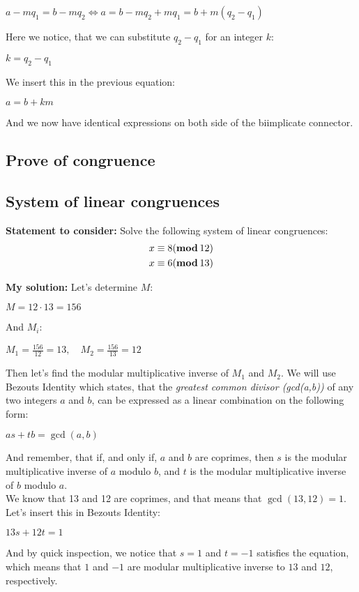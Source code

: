 \documentclass{report}
\newcommand{\cent}[1]{\begin{center}#1\end{center}}
\newcommand{\mAlign}[1]{\begin{align*}#1\end{align*}}
\newcommand{\assignmentDescription}{\textbf{Statement to consider: }}
\newcommand{\solution}{\textbf{My solution: }}
\newcommand{\QED}{\boxed{}}
\newcommand{\modInline}{\text{\textbf{mod\,}}}
\begin{document}
	\cent{$a - m q_1 = b - mq_2 \Leftrightarrow a = b -mq_2 + mq_1 = b + m(q_2-q_1)$}
	
	Here we notice, that we can substitute $q_2 - q_1$ for an integer $k$:
	
	\cent{$k = q_2 -q_1$}
	
	We insert this in the previous equation:
	
	\cent{$a = b+km$}
	
	And we now have identical expressions on both side of the biimplicate connector.\\
	\QED
 	\subsection{Prove of congruence}
 	
 	\subsection{System of linear congruences}
 	\assignmentDescription
 	Solve the following system of linear congruences:
 	\mAlign{x &\equiv 8 (\modInline 12) \\
 				  x &\equiv 6 (\modInline 13)}
 	
 	\solution
 	Let's determine $M$:
 	
 	\cent{$M = 12 \cdot 13 = 156$}
 	
 	And $M_i$:
 	
 	\cent{$M_1 = \frac{156}{12} = 13, \quad M_2 = \frac{156}{13} = 12$}
 	
 	Then let's find the modular multiplicative inverse of $M_1$ and $M_2$. We will use Bezouts Identity which states, that the \textit{greatest common divisor (gcd(a,b))} of any two integers $a$ and $b$, can be expressed as a linear combination on the following form:
 	
 	\cent{$as+tb=\gcd(a,b)$}
 	
 	And remember, that if, and only if, $a$ and $b$ are coprimes, then $s$ is the modular multiplicative inverse of $a$ modulo $b$, and $t$ is the modular multiplicative inverse of $b$ modulo $a$.\\
 	
 	We know that 13 and 12 are coprimes, and that means that $\gcd(13,12) = 1$. Let's insert this in Bezouts Identity:
 	
 	\cent{$13s+12t=1$}
 	
 	And by quick inspection, we notice that $s=1$ and $t=-1$ satisfies the equation, which means that $1$ and $-1$ are modular multiplicative inverse to $13$ and $12$, respectively.\\
 	
\end{document}
